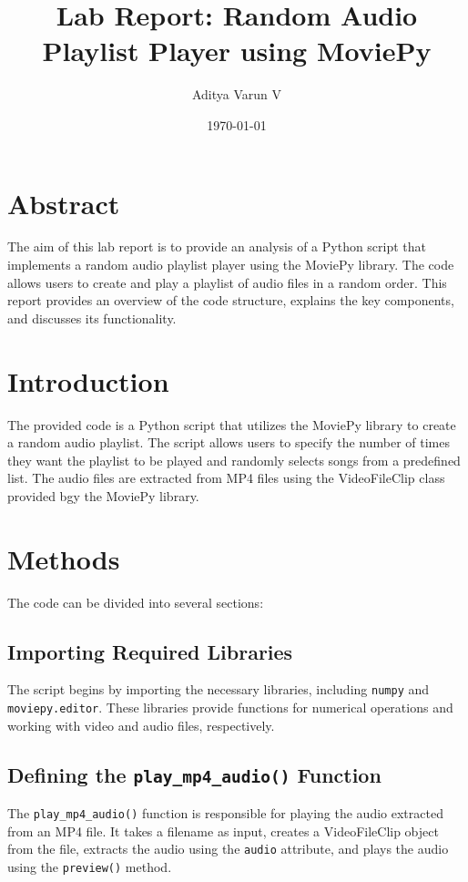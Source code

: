 \documentclass{article}
\title{Lab Report: Random Audio Playlist Player using MoviePy}
\author{Aditya Varun V}
\date{\today}
\begin{document}
\maketitle

\section{Abstract}
The aim of this lab report is to provide an analysis of a Python script that implements a random audio playlist player using the MoviePy library. The code allows users to create and play a playlist of audio files in a random order. This report provides an overview of the code structure, explains the key components, and discusses its functionality.

\section{Introduction}
The provided code is a Python script that utilizes the MoviePy library to create a random audio playlist. The script allows users to specify the number of times they want the playlist to be played and randomly selects songs from a predefined list. The audio files are extracted from MP4 files using the VideoFileClip class provided bgy the MoviePy library.

\section{Methods}
The code can be divided into several sections:

\subsection{Importing Required Libraries}
The script begins by importing the necessary libraries, including \texttt{numpy} and \texttt{moviepy.editor}. These libraries provide functions for numerical operations and working with video and audio files, respectively.

\subsection{Defining the \texttt{play\_mp4\_audio()} Function}
The \texttt{play\_mp4\_audio()} function is responsible for playing the audio extracted from an MP4 file. It takes a filename as input, creates a VideoFileClip object from the file, extracts the audio using the \texttt{audio} attribute, and plays the audio using the \texttt{preview()} method.
\end{document}
